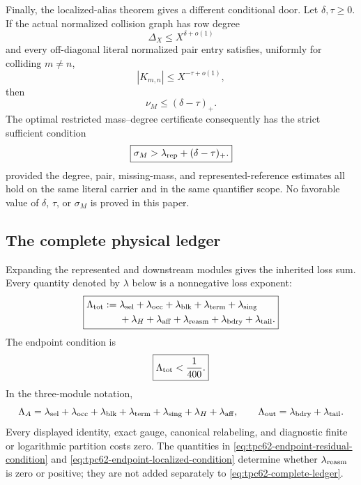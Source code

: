 Finally, the localized-alias theorem gives a different conditional door.
Let \(\delta,\tau\ge0\).  If the actual normalized collision graph has row degree
\begin{equation}
 \Delta_X\le X^{\delta+o(1)}
 \label{eq:tpc62-endpoint-overlap-degree}
\end{equation}
and every off-diagonal literal normalized pair entry satisfies, uniformly
for colliding \(m\ne n\),
\begin{equation}
 |K_{m,n}|\le X^{-\tau+o(1)},
 \label{eq:tpc62-endpoint-pair-saving}
\end{equation}
then
\begin{equation}
 \nu_M\le(\delta-\tau)_+.
 \label{eq:tpc62-endpoint-kappa-from-pairs}
\end{equation}
The optimal restricted mass--degree certificate consequently has the strict
sufficient condition
\begin{equation}
 \boxed{
 \sigma_M>
 \lambda_{\rm rep}+(\delta-\tau)_+.}
 \label{eq:tpc62-endpoint-localized-condition}
\end{equation}
provided the degree, pair, missing-mass, and represented-reference estimates
all hold on the same literal carrier and in the same quantifier scope.
No favorable value of \(\delta\), \(\tau\), or \(\sigma_M\) is proved in
this paper.

\subsection{The complete physical ledger}

Expanding the represented and downstream modules gives the inherited loss
sum.  Every quantity denoted by \(\lambda\) below is a nonnegative loss
exponent:
\begin{equation}
 \boxed{
 \begin{aligned}
 \Lambda_{\rm tot}:={}&
 \lambda_{\rm sel}+\lambda_{\rm occ}
 +\lambda_{\rm blk}+\lambda_{\rm term}
 +\lambda_{\rm sing}\\
 &+\lambda_H+\lambda_{\rm aff}
 +\lambda_{\rm reasm}
 +\lambda_{\rm bdry}+\lambda_{\rm tail}.
 \end{aligned}}
 \label{eq:tpc62-complete-ledger}
\end{equation}
The endpoint condition is
\begin{equation}
 \boxed{\Lambda_{\rm tot}<\frac1{400}.}
 \label{eq:tpc62-strict-ledger}
\end{equation}
In the three-module notation,
\begin{equation}
 \Lambda_A=\lambda_{\rm sel}+\lambda_{\rm occ}
 +\lambda_{\rm blk}+\lambda_{\rm term}+\lambda_{\rm sing}
 +\lambda_H+\lambda_{\rm aff},
 \qquad
 \Lambda_{\rm out}=\lambda_{\rm bdry}+\lambda_{\rm tail}.
 \label{eq:tpc62-module-ledger-identification}
\end{equation}
Every displayed identity, exact gauge, canonical relabeling, and diagnostic
finite or logarithmic partition costs zero.  The quantities in
\eqref{eq:tpc62-endpoint-residual-condition} and
\eqref{eq:tpc62-endpoint-localized-condition} determine whether
\(\lambda_{\rm reasm}\) is zero or positive; they are not added separately
to \eqref{eq:tpc62-complete-ledger}.

